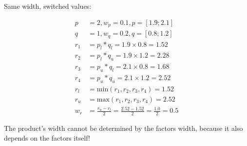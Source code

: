 \documentclass[a4paper]{scrartcl}
\begin{document}
Same width, switched values:

\begin{align}
p &= 2, w_p = 0.1, p = [1.9;2.1] \\
q &= 1, w_q = 0.2, q = [0.8;1.2] \\
r_1 &= p_l * q_l = 1.9 \times 0.8 = 1.52 \\
r_2 &= p_l * q_u = 1.9 \times 1.2 = 2.28 \\
r_3 &= p_u * q_l = 2.1 \times 0.8 = 1.68 \\
r_4 &= p_u * q_u = 2.1 \times 1.2 = 2.52 \\
r_l &= \text{min}(r_1, r_2, r_3, r_4) = 1.52 \\
r_u &= \text{max}(r_1, r_2, r_3, r_4) = 2.52 \\
w_r &= \frac{r_u - r_l}{2} = \frac{2.52 - 1.52}{2} = \frac{1.0}{2} = 0.5
\end{align}

The product's width cannot be determined by the factors width, because it also depends on the factors itself!
\end{document}

